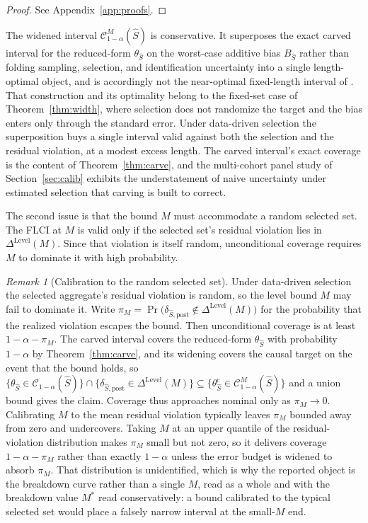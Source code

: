 \documentclass[12pt]{article}
\theoremstyle{remark}
\newtheorem{remark}{Remark}
\begin{document}
\begin{proof}
See Appendix~\ref{app:proofs}.
\end{proof}

The widened interval $\mathcal C^{M}_{1-\alpha}(\hat S)$ is conservative. It superposes the
exact carved interval for the reduced-form $\theta_{\hat S}$ on the worst-case additive bias $B_{\hat S}$ rather
than folding sampling, selection, and identification uncertainty into a single length-optimal object, and is
accordingly not the near-optimal fixed-length interval of \citet{armstrong2018}. That construction and its
optimality belong to the fixed-set case of Theorem~\ref{thm:width}, where selection does not randomize the target
and the bias enters only through the standard error. Under data-driven selection the superposition buys a single
interval valid against both the selection and the residual violation, at a modest excess length. The carved
interval's exact coverage is the content of Theorem~\ref{thm:carve}, and the multi-cohort panel study of
Section~\ref{sec:calib} exhibits the understatement of naive uncertainty under estimated selection that
carving is built to correct.

The second issue is that the bound $M$ must accommodate a random selected set. The FLCI at $M$ is valid
only if the selected set's residual violation lies in $\Delta^{\mathrm{Level}}(M)$. Since that violation
is itself random, unconditional coverage requires $M$ to dominate it with high probability.

\begin{remark}[Calibration to the random selected set]\label{rem:calib}
Under data-driven selection the selected aggregate's residual violation is random, so the level bound $M$
may fail to dominate it. Write $\pi_M=\Pr\big(\delta_{\hat S,\mathrm{post}}\notin\Delta^{\mathrm{Level}}(M)\big)$
for the probability that the realized violation escapes the bound. Then unconditional coverage is at least
$1-\alpha-\pi_M$. The carved interval covers the reduced-form $\theta_{\hat S}$ with probability $1-\alpha$
by Theorem~\ref{thm:carve}, and its widening covers the causal target on the event that the bound holds, so
$\{\theta_{\hat S}\in\mathcal C_{1-\alpha}(\hat S)\}\cap\{\delta_{\hat S,\mathrm{post}}\in
\Delta^{\mathrm{Level}}(M)\}\subseteq\{\theta_{\hat S}^{\mathrm c}\in\mathcal C^{M}_{1-\alpha}(\hat S)\}$ and a
union bound gives the claim. Coverage thus approaches nominal only as $\pi_M\to0$. Calibrating $M$
to the mean residual violation typically leaves $\pi_M$ bounded away from zero and undercovers. Taking $M$ at
an upper quantile of the residual-violation distribution makes $\pi_M$ small but not zero, so it delivers
coverage $1-\alpha-\pi_M$ rather than exactly $1-\alpha$ unless the error budget is widened to absorb
$\pi_M$. That distribution is unidentified, which is
why the reported object is the breakdown curve rather than a single $M$, read as a whole and with the
breakdown value $M^\ast$ read conservatively: a bound calibrated to the typical selected set would place a
falsely narrow interval at the small-$M$ end.
\end{remark}
\end{document}
